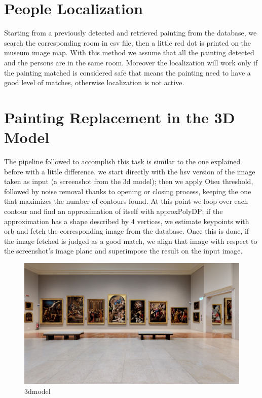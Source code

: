 \documentclass[conference]{IEEEtran}
\begin{document}
\section{People Localization}
Starting from a previously detected and retrieved painting from the database, we search the corresponding room in csv file, then a little red dot is printed on the museum image map. With this method we assume that all the painting detected and the persons are in the same room.
Moreover the localization will work only if the painting matched is considered safe that means the painting need to have a good level of matches, otherwise localization is not active.

\section{Painting Replacement in the 3D Model}
The pipeline followed to accomplish this task is similar to the one explained before with a little difference. we start directly with the hsv version of the image taken as input (a screenshot from the 3d model); then we apply Otsu threshold, followed by noise removal thanks to opening or closing process, keeping the one that maximizes the number of contours found. At this point we loop over each contour and find an approximation of itself with approxPolyDP; if the approximation has a shape described by 4 vertices, we estimate keypoints with orb and fetch the corresponding image from the database. Once this is done, if the image fetched is judged as a good match, we align that image with respect to the screenshot’s image plane and superimpose the result on the input image.

\begin{figure}[htbp]
\centerline{\includegraphics[width=0.8\columnwidth]{../screenshots_3d_model/screenshot_01.jpg}}
\caption{3dmodel}
\label{fig_3d_model}
\end{figure}
\end{document}
